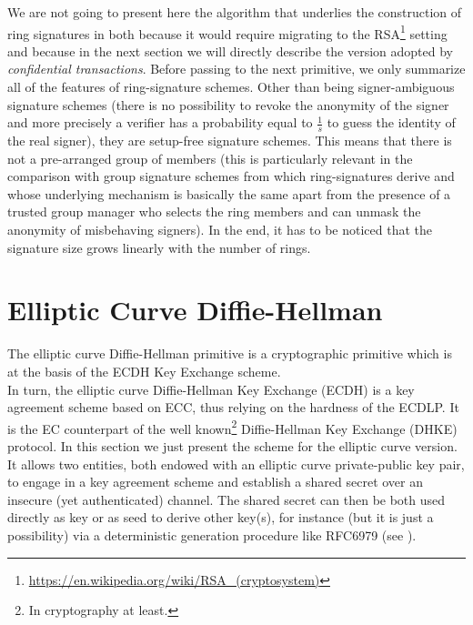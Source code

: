 We are not going to present here the algorithm that underlies the construction of ring signatures in \cite{LeakSecret} both because it would require migrating to the RSA\footnote{\url{https://en.wikipedia.org/wiki/RSA_(cryptosystem)}} setting and because in the next section we will directly describe the version adopted by \textit{confidential transactions}. Before passing to the next primitive, we only summarize all of the features of ring-signature schemes. Other than being signer-ambiguous signature schemes (there is no possibility to revoke the anonymity of the signer and more precisely a verifier has a probability equal to $\frac{1}{s}$ to guess the identity of the real signer), they are setup-free signature schemes. This means that there is not a pre-arranged group of members (this is particularly relevant in the comparison with group signature schemes from which ring-signatures derive and whose underlying mechanism is basically the same apart from the presence of a trusted group manager who selects the ring members and can unmask the anonymity of misbehaving signers). In the end, it has to be noticed that the signature size grows linearly with the number of rings.

\section{Elliptic Curve Diffie-Hellman}
\label{ECDH}
The elliptic curve Diffie-Hellman primitive is a cryptographic primitive which is at the basis of the ECDH Key Exchange scheme.\\
In turn, the elliptic curve Diffie-Hellman Key Exchange (ECDH) is a key agreement scheme based on ECC, thus relying on the hardness of the ECDLP. It is the EC counterpart of the well known\footnote{In cryptography at least.} Diffie-Hellman Key Exchange (DHKE) protocol. In this section we just present the scheme for the elliptic curve version.\\
It allows two entities, both endowed with an elliptic curve private-public key pair, to engage in a key agreement scheme and establish a shared secret over an insecure (yet authenticated) channel. The shared secret can then be both used directly as key or as seed to derive other key(s), for instance (but it is just a possibility) via a deterministic generation procedure like RFC6979 (see \cite{rfc6979}).
